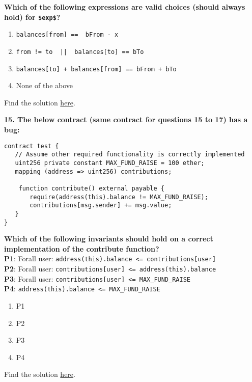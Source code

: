 \textbf{Which of the following expressions are valid choices (should always hold) for \texttt{\$exp\$}?}

\begin{enumerate}[label=\Alph*.]
    \item\verb|balances[from] ==  bFrom - x|
    \item\verb?from != to  ||  balances[to] == bTo?
    \item\verb|balances[to] + balances[from] == bFrom + bTo|
    \item None of the above
\end{enumerate}

Find the solution \hyperref[sec:raceXcertora_q14]{here}.\\

\pagebreak

\textbf{15. The below contract (same contract for questions 15 to 17) has a bug:}

\begin{lstlisting}[language=Solidity, style=solStyle]
contract test {
   // Assume other required functionality is correctly implemented
   uint256 private constant MAX_FUND_RAISE = 100 ether;
   mapping (address => uint256) contributions;

    function contribute() external payable {
       require(address(this).balance != MAX_FUND_RAISE);
       contributions[msg.sender] += msg.value;
   }
}
\end{lstlisting}

\textbf{Which of the following invariants should hold on a correct implementation of the contribute function?}\\

\textbf{P1}: Forall user: \verb|address(this).balance <= contributions[user]|\\
\textbf{P2}: Forall user: \verb|contributions[user] <= address(this).balance|\\
\textbf{P3}: Forall user: \verb|contributions[user] <= MAX_FUND_RAISE|\\
\textbf{P4}: \verb|address(this).balance <= MAX_FUND_RAISE|

\begin{enumerate}[label=\Alph*.]
    \item P1
    \item P2
    \item P3
    \item P4
\end{enumerate}

Find the solution \hyperref[sec:raceXcertora_q15]{here}.\\

